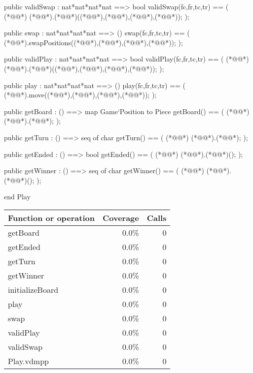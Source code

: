 \begin{vdm_al}
  public validSwap : nat*nat*nat*nat ==> bool
   validSwap(fc,fr,tc,tr) ==
   (
    (*@@*) (*@@*).(*@@*)((*@@*),(*@@*),(*@@*),(*@@*));
   );
   
  public swap : nat*nat*nat*nat ==> ()
   swap(fc,fr,tc,tr) ==
   (
    (*@@*).swapPositions((*@@*),(*@@*),(*@@*),(*@@*));
   );
   
  public validPlay : nat*nat*nat*nat ==> bool
   validPlay(fc,fr,tc,tr) ==
   (
    (*@@*) (*@@*).(*@@*)((*@@*),(*@@*),(*@@*),(*@@*));
   );
    
  public play : nat*nat*nat*nat ==> ()
   play(fc,fr,tc,tr) ==
   (
    (*@@*).move((*@@*),(*@@*),(*@@*),(*@@*));
   );
   
  public getBoard : () ==> map Game`Position to Piece
   getBoard() ==
   (
    (*@@*) (*@@*).(*@@*);
   );
   
  public getTurn : () ==> seq of char
   getTurn() ==
   (
    (*@@*) (*@@*).(*@@*);
   );
   
  public getEnded : () ==> bool
   getEnded() ==
   (
    (*@@*) (*@@*).(*@@*)();
   );
   
  public getWinner : () ==> seq of char
   getWinner() ==
   (
    (*@@*) (*@@*).(*@@*)();
   );
   
end Play
\end{vdm_al}
\bigskip
\begin{longtable}{|l|r|r|}
\hline
Function or operation & Coverage & Calls \\
\hline
\hline
getBoard & 0.0\% & 0 \\
\hline
getEnded & 0.0\% & 0 \\
\hline
getTurn & 0.0\% & 0 \\
\hline
getWinner & 0.0\% & 0 \\
\hline
initializeBoard & 0.0\% & 0 \\
\hline
play & 0.0\% & 0 \\
\hline
swap & 0.0\% & 0 \\
\hline
validPlay & 0.0\% & 0 \\
\hline
validSwap & 0.0\% & 0 \\
\hline
\hline
Play.vdmpp & 0.0\% & 0 \\
\hline
\end{longtable}

